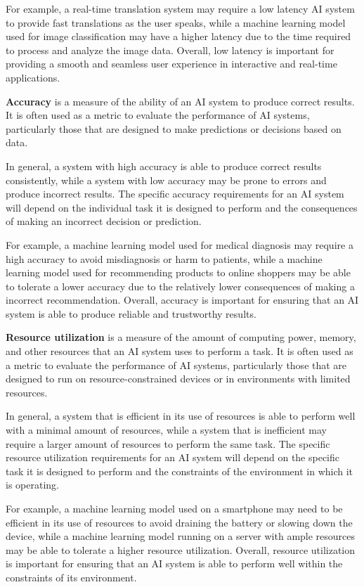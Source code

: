 For example, a real-time translation system may require a low latency AI system to provide fast 
translations as the user speaks, while a machine learning model used for image classification may 
have a higher latency due to the time required to process and analyze the image data. Overall, low 
latency is important for providing a smooth and seamless user experience in interactive and real-time applications.

\textbf{Accuracy} is a measure of the ability of an AI system to produce correct results.
It is often used as a metric to evaluate the performance of AI systems, particularly
those that are designed to make predictions or decisions based on data.

In general, a system with high accuracy is able to produce correct results consistently,
while a system with low accuracy may be prone to errors and produce incorrect results.
The specific accuracy requirements for an AI system will depend on the individual task it is
designed to perform and the consequences of making an incorrect decision or prediction.

For example, a machine learning model used for medical diagnosis may require a
high accuracy to avoid misdiagnosis or harm to patients, while a machine learning model
used for recommending products to online shoppers may be able to tolerate a lower accuracy due to
the relatively lower consequences of making a incorrect recommendation. Overall, accuracy is important for 
ensuring that an AI system is able to produce reliable and trustworthy results.

\textbf{Resource utilization} is a measure of the amount of computing power, memory, and other 
resources that an AI system uses to perform a task.
It is often used as a metric to evaluate the performance of AI systems, particularly those that 
are designed to run on resource-constrained devices or in environments with limited resources.

In general, a system that is efficient in its use of resources is able to perform well with a 
minimal amount of resources, while a system that is inefficient may require a larger amount of 
resources to perform the same task. The specific resource utilization requirements for an AI system 
will depend on the specific task it is designed to perform and the constraints of the environment 
in which it is operating.

For example, a machine learning model used on a smartphone may need to be efficient in its use of 
resources to avoid draining the battery or slowing down the device, while a machine learning model 
running on a server with ample resources may be able to tolerate a higher resource utilization. 
Overall, resource utilization is important for ensuring that an AI system is able to perform well within 
the constraints of its environment.

